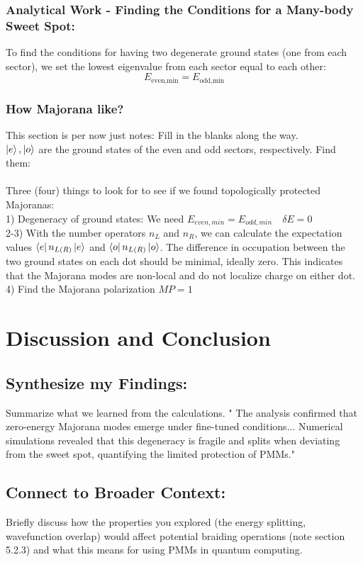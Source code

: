 \documentclass[11pt, letterpaper, titlepage]{article}
\begin{document}
\subsubsection{Analytical Work - Finding the Conditions for a Many-body Sweet Spot:}
To find the conditions for having two degenerate ground states (one from each sector), we set the lowest eigenvalue from each sector equal to each other:
$$E_{\text{even,min}} = E_{\text{odd,min}}$$


\subsubsection{How Majorana like?}
This section is per now just notes: Fill in the blanks along the way.\\
$\ket{e}, \ket{o}$ are the ground states of the even and odd sectors, respectively. Find them:\\\\
Three (four) things to look for to see if we found topologically protected Majoranas:\\
1) Degeneracy of ground states: We need $E_{even,min} = E_{odd,min}\quad  δE=0$\\
2-3) With the number operators $n_L$ and $n_R$, we can calculate the expectation values $\bra{e}n_{L(R)}\ket{e}$ and $\bra{o}n_{L(R)}\ket{o}$. The difference in occupation between the two ground states on each dot should be minimal, ideally zero. This indicates that the Majorana modes are non-local and do not localize charge on either dot.\\
4) Find the Majorana polarization $MP = 1$

\section{Discussion and Conclusion}
\subsection{Synthesize my Findings:} Summarize what we learned from the calculations. " The analysis confirmed that zero-energy Majorana modes emerge under fine-tuned conditions... Numerical simulations revealed that this degeneracy is fragile and splits when deviating from the sweet spot, quantifying the limited protection of PMMs."\par
\subsection{Connect to Broader Context:} Briefly discuss how the properties you explored (the energy splitting, wavefunction overlap) would affect potential braiding operations (note section 5.2.3) and what this means for using PMMs in quantum computing.\par
\end{document}
